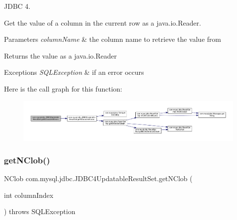 J\+D\+BC 4.

Get the value of a column in the current row as a java.\+io.\+Reader. 


\begin{DoxyParams}{Parameters}
{\em column\+Name} & the column name to retrieve the value from\\
\hline
\end{DoxyParams}
\begin{DoxyReturn}{Returns}
the value as a java.\+io.\+Reader
\end{DoxyReturn}

\begin{DoxyExceptions}{Exceptions}
{\em S\+Q\+L\+Exception} & if an error occurs \\
\hline
\end{DoxyExceptions}
Here is the call graph for this function\+:
\nopagebreak
\begin{figure}[H]
\begin{center}
\leavevmode
\includegraphics[width=350pt]{classcom_1_1mysql_1_1jdbc_1_1_j_d_b_c4_updatable_result_set_ad28040d91ad0d2f2103e89935b84416f_cgraph}
\end{center}
\end{figure}
\mbox{\label{classcom_1_1mysql_1_1jdbc_1_1_j_d_b_c4_updatable_result_set_aba4ddb87766599f6de1219a1bf1e1413}} 
\subsubsection{\texorpdfstring{get\+N\+Clob()}{getNClob()}\hspace{0.1cm}{\footnotesize\ttfamily [1/2]}}
{\footnotesize\ttfamily N\+Clob com.\+mysql.\+jdbc.\+J\+D\+B\+C4\+Updatable\+Result\+Set.\+get\+N\+Clob (\begin{DoxyParamCaption}\item[{int}]{column\+Index }\end{DoxyParamCaption}) throws S\+Q\+L\+Exception}

